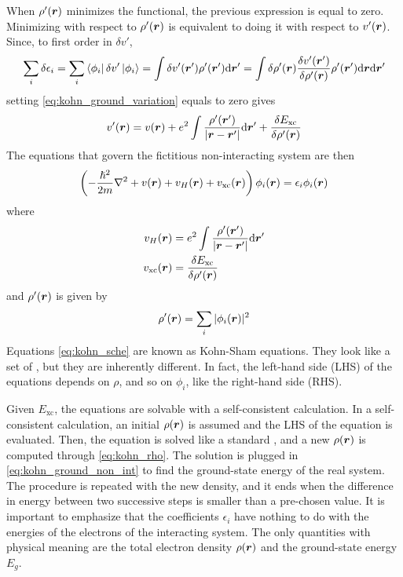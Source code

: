 When $\rho'(\mathbf{\boldsymbol{r}})$ minimizes the functional, the previous expression is equal to zero. Minimizing with respect to $\rho'(\mathbf{\boldsymbol{r}})$ is equivalent to doing it with respect to $v'(\mathbf{\boldsymbol{r}})$. Since, to first order in $\delta v'$,
\begin{equation}
    \sum_i \delta \epsilon_i = \sum_i \bra{\phi_i} \delta v' \ket{\phi_i}
    = \int \rrp{\delta v'} \rrp{\rho'} \dr'
    = \int \delta \rr{\rho'} \frac{\delta v'(\vec{r}')}{\delta \rr{\rho'}} \rrp{\rho'} \dr \dr'
\end{equation}
setting \cref{eq:kohn_ground_variation} equals to zero gives
\begin{equation}
    \rr{v'} = \rr{v} + e^2 \int \frac{\rho'(\vec{r}')}{|\vec{r}-\vec{r}'|} \dr' + \frac{\delta E_\text{xc}}{\delta\rr{\rho'}}
\end{equation}
The equations that govern the fictitious non-interacting system are then
\begin{equation} \label{eq:kohn_sche}
    \left(-\frac{\hslash^2}{2m} \laplacian + \rr{v} + \rr{v_H} + \rr{v_\text{xc}} \right) \rr{\phi_i} = \epsilon_i \rr{\phi_i}
\end{equation}
where
\begin{align}
    \rr{v_H}         & = e^2 \int \frac{\rho'(\vec{r}')}{|\vec{r}-\vec{r}'|} \dr' \\
    \rr{v_\text{xc}} & =  \frac{\delta E_\text{xc}}{\delta\rr{\rho'}}
\end{align}
and $\rho'(\mathbf{\boldsymbol{r}})$ is given by
\begin{equation} \label{eq:kohn_rho}
    \rho'(\mathbf{\boldsymbol{r}}) = \sum_i |\phi_i(\mathbf{\boldsymbol{r}})|^2
\end{equation}
Equations \ref{eq:kohn_sche} are known as Kohn-Sham equations. They look like a set of \sches, but they are inherently different. In fact, the left-hand side (LHS) of the equations depends on $\rho$, and so on $\phi_i$, like the right-hand side (RHS).

Given $E_\text{xc}$, the equations are solvable with a self-consistent calculation. In a self-consistent calculation, an initial $\rho(\mathbf{\boldsymbol{r}})$ is assumed and the LHS of the equation is evaluated. Then, the equation is solved like a standard \sche, and a new $\rho(\mathbf{\boldsymbol{r}})$ is computed through \cref{eq:kohn_rho}. The solution is plugged in \cref{eq:kohn_ground_non_int} to find the ground-state energy of the real system. The procedure is repeated with the new density, and it ends when the difference in energy between two successive steps is smaller than a pre-chosen value. It is important to emphasize that the coefficients $\epsilon_i$ have nothing to do with the energies of the electrons of the interacting system. The only quantities with physical meaning are the total electron density $\rho(\mathbf{\boldsymbol{r}})$ and the ground-state energy $E_g$.

